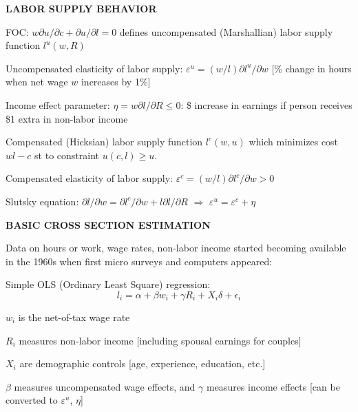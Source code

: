 \documentclass[landscape]{slides}
\begin{document}
\begin{slide}
\begin{center}
{\bf LABOR SUPPLY BEHAVIOR}
\end{center}
FOC: $w \partial u/ \partial c + \partial u/ \partial l =0$ defines uncompensated (Marshallian)  labor
supply function $l^u(w,R)$

Uncompensated elasticity of labor supply: $\varepsilon^u = (w/l)
\partial l^u/ \partial w$ [\% change in hours when net wage $w
$ increases by 1\%]

Income effect parameter: $\eta = w \partial l / \partial R \leq
0$: \$ increase in earnings if person receives \$1 extra in
non-labor income

Compensated (Hicksian) labor supply function $l^c(w,u)$ which
minimizes cost $w l - c$ st to constraint $u(c,l) \geq u$.

Compensated elasticity of labor supply: $\varepsilon^c = (w/l)
\partial l^c/ \partial w>0$

Slutsky equation: $\partial l/ \partial w = \partial l^c/ \partial
w +l  \partial l /\partial R$ $\Rightarrow$ $\varepsilon^u =
\varepsilon^c + \eta $

\end{slide}




%
%
%
%
%
%

\begin{slide}
\begin{center}
{\bf BASIC CROSS SECTION ESTIMATION}
\end{center}
Data on hours or work, wage rates, non-labor income started
becoming available in the 1960s when first micro surveys and
computers appeared:

Simple OLS (Ordinary Least Square) regression:
$$l_i = \alpha + \beta w_i + \gamma R_i + X_i \delta +
\epsilon_i$$

$w_i$ is the net-of-tax wage rate

$R_i$ measures non-labor income [including spousal earnings for
couples]

$X_i$ are demographic controls [age, experience, education, etc.]

$\beta$ measures uncompensated wage effects, and $\gamma$ measures income
effects [can be converted to $\varepsilon^u$, $\eta$]
\end{slide}
\end{document}
